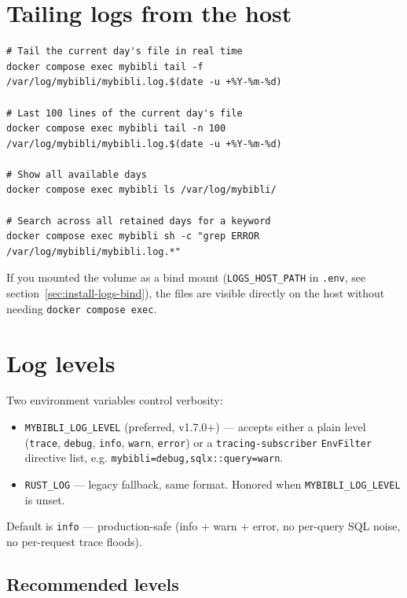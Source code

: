 \section{Tailing logs from the host}

\begin{lstlisting}
# Tail the current day's file in real time
docker compose exec mybibli tail -f /var/log/mybibli/mybibli.log.$(date -u +%Y-%m-%d)

# Last 100 lines of the current day's file
docker compose exec mybibli tail -n 100 /var/log/mybibli/mybibli.log.$(date -u +%Y-%m-%d)

# Show all available days
docker compose exec mybibli ls /var/log/mybibli/

# Search across all retained days for a keyword
docker compose exec mybibli sh -c "grep ERROR /var/log/mybibli/mybibli.log.*"
\end{lstlisting}

If you mounted the volume as a bind mount (\texttt{LOGS\_HOST\_PATH}
in \texttt{.env}, see section~\ref{sec:install-logs-bind}), the files
are visible directly on the host without needing
\texttt{docker compose exec}.

\section{Log levels}
\label{sec:log-levels}

Two environment variables control verbosity:

\begin{itemize}
  \item \texttt{MYBIBLI\_LOG\_LEVEL} (preferred, v1.7.0+) — accepts
        either a plain level (\texttt{trace}, \texttt{debug},
        \texttt{info}, \texttt{warn}, \texttt{error}) or a
        \texttt{tracing-subscriber} \texttt{EnvFilter} directive
        list, e.g. \texttt{mybibli=debug,sqlx::query=warn}.
  \item \texttt{RUST\_LOG} — legacy fallback, same format. Honored
        when \texttt{MYBIBLI\_LOG\_LEVEL} is unset.
\end{itemize}

Default is \texttt{info} — production-safe (info + warn + error,
no per-query SQL noise, no per-request trace floods).

\subsection*{Recommended levels}

